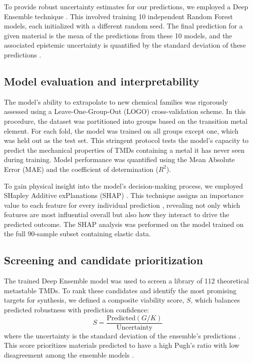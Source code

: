 \documentclass[]{article}
\begin{document}
To provide robust uncertainty estimates for our predictions, we employed a Deep Ensemble technique \citep{lakshminarayanan2017simplescalablepredictiveuncertainty}. This involved training 10 independent Random Forest models, each initialized with a different random seed. The final prediction for a given material is the mean of the predictions from these 10 models, and the associated epistemic uncertainty is quantified by the standard deviation of these predictions \citep{egele2022autodeuqautomateddeepensemble}.

\subsection{Model evaluation and interpretability}

The model's ability to extrapolate to new chemical families was rigorously assessed using a Leave-One-Group-Out (LOGO) cross-validation scheme. In this procedure, the dataset was partitioned into groups based on the transition metal element. For each fold, the model was trained on all groups except one, which was held out as the test set. This stringent protocol tests the model's capacity to predict the mechanical properties of TMDs containing a metal it has never seen during training. Model performance was quantified using the Mean Absolute Error (MAE) and the coefficient of determination ($R^2$).

To gain physical insight into the model's decision-making process, we employed SHapley Additive exPlanations (SHAP) \citep{lundberg2017unifiedapproachinterpretingmodel}. This technique assigns an importance value to each feature for every individual prediction \citep{lundberg2017unifiedapproachinterpretingmodel}, revealing not only which features are most influential overall but also how they interact to drive the predicted outcome. The SHAP analysis was performed on the model trained on the full 90-sample subset containing elastic data.

\subsection{Screening and candidate prioritization}

The trained Deep Ensemble model was used to screen a library of 112 theoretical metastable TMDs. To rank these candidates and identify the most promising targets for synthesis, we defined a composite viability score, $S$, which balances predicted robustness with prediction confidence:
\begin{equation}
S = \frac{\text{Predicted}(G/K)}{\text{Uncertainty}}
\end{equation}
where the uncertainty is the standard deviation of the ensemble's predictions \citep{mcafee2026iconfusedconfusingdeep}. This score prioritizes materials predicted to have a high Pugh's ratio with low disagreement among the ensemble models \citep{mcafee2026iconfusedconfusingdeep}.
\end{document}
